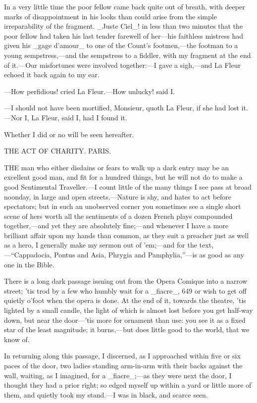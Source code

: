 \documentclass[twoside]{article}
\begin{document}
In a very little time the poor fellow came back quite out of breath, with
deeper marks of disappointment in his looks than could arise from the
simple irreparability of the fragment.  _Juste Ciel_! in less than two
minutes that the poor fellow had taken his last tender farewell of
her—his faithless mistress had given his _gage d’amour_ to one of the
Count’s footmen,—the footman to a young sempstress,—and the sempstress to
a fiddler, with my fragment at the end of it.—Our misfortunes were
involved together:—I gave a sigh,—and La Fleur echoed it back again to my
ear.

—How perfidious! cried La Fleur.—How unlucky! said I.

—I should not have been mortified, Monsieur, quoth La Fleur, if she had
lost it.—Nor I, La Fleur, said I, had I found it.

Whether I did or no will be seen hereafter.




THE ACT OF CHARITY.
PARIS.


THE man who either disdains or fears to walk up a dark entry may be an
excellent good man, and fit for a hundred things, but he will not do to
make a good Sentimental Traveller.—I count little of the many things I
see pass at broad noonday, in large and open streets.—Nature is shy, and
hates to act before spectators; but in such an unobserved corner you
sometimes see a single short scene of hers worth all the sentiments of a
dozen French plays compounded together,—and yet they are absolutely
fine;—and whenever I have a more brilliant affair upon my hands than
common, as they suit a preacher just as well as a hero, I generally make
my sermon out of ’em;—and for the text,—“Cappadocia, Pontus and Asia,
Phrygia and Pamphylia,”—is as good as any one in the Bible.

There is a long dark passage issuing out from the Opera Comique into a
narrow street; ’tis trod by a few who humbly wait for a _fiacre_, {649}
or wish to get off quietly o’foot when the opera is done.  At the end of
it, towards the theatre, ’tis lighted by a small candle, the light of
which is almost lost before you get half-way down, but near the door—’tis
more for ornament than use: you see it as a fixed star of the least
magnitude; it burns,—but does little good to the world, that we know of.

In returning along this passage, I discerned, as I approached within five
or six paces of the door, two ladies standing arm-in-arm with their backs
against the wall, waiting, as I imagined, for a _fiacre_;—as they were
next the door, I thought they had a prior right; so edged myself up
within a yard or little more of them, and quietly took my stand.—I was in
black, and scarce seen.
\end{document}
